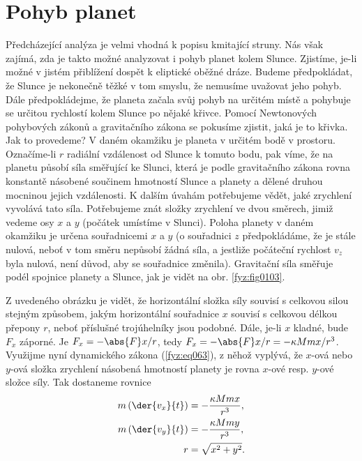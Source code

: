   \section{Pohyb planet}\label{fyz:IchapIXsecVII}
    Předcházející analýza je velmi vhodná k popisu kmitající stru\-ny. Nás však zajímá, zda je 
    takto 
    možné analyzovat i pohyb planet kolem Slunce. Zjistíme, je-li možné v jistém přiblížení dospět 
    k eliptické oběžné dráze. Budeme předpokládat, že Slunce je nekonečně těžké v tom smyslu, že 
    nemusíme uvažovat jeho pohyb. Dále předpokládejme, že planeta začala svůj pohyb na určitém 
    místě a pohybuje se určitou rychlostí kolem Slunce po nějaké křivce. Pomocí Newtonových 
    pohybových zákonů a gravitačního zákona se pokusíme zjistit, jaká je to křivka. Jak to 
    provedeme? V daném okamžiku je planeta v určitém bodě v prostoru. Označíme-li \(r\) radiální 
    vzdálenost od Slunce k tomuto bodu, pak víme, že na planetu působí síla směřující ke Slunci, 
    která je podle gravitačního zákona rovna konstantě násobené součinem hmotností Slunce a planety 
    a dělené druhou mocninou jejich vzdálenosti. K dalším úvahám potřebujeme vědět, jaké zrychlení 
    vyvolává tato síla. Potřebujeme znát složky zrychlení ve dvou směrech, jimiž vedeme osy \(x\) a 
    \(y\) (počátek umístíme v Slunci). Poloha planety v daném okamžiku je určena souřadnicemi \(x\) 
    a \(y\) (o souřadnici \(z\) předpokládáme, že je stále nulová, neboť v tom směru nepůsobí žádná 
    síla, a jestliže počáteční rychlost \(v_z\) byla nulová, není důvod, aby se souřadnice 
    změnila). Gravitační síla směřuje podél spojnice planety a Slunce, jak je vidět na obr. 
    \ref{fyz:fig0103}.


    Z uvedeného obrázku je vidět, že horizontální složka síly souvisí s celkovou silou stejným 
    způsobem, jakým horizontální souřadnice \(x\) souvisí s celkovou délkou přepony \(r\), neboť 
    příslušné trojúhelníky jsou podobné. Dále, je-li \(x\) kladné, bude \(F_x\) záporné. Je \(F_x = 
    -\abs{F}x/r\), tedy \(F_x = -\abs{F}x/r = -\kappa Mmx/r^3\). Využijme nyní dynamického zákona 
    (\ref{fyz:eq063}), z něhož vyplývá, že \(x\)-ová nebo \(y\)-ová složka zrychlení násobená 
    hmotností planety je rovna \(x\)-ové resp. \(y\)-ové složce síly. Tak dostaneme rovnice
    \begin{subequations}\label{fyz:eq133}
      \begin{align} 
        m\left(\der{v_x}{t}\right) &= -\frac{\kappa Mmx}{r^3}, \label{fyz:eq133a}   \\
        m\left(\der{v_y}{t}\right) &= -\frac{\kappa Mmy}{r^3}, \label{fyz:eq133b}   \\
                                r &= \sqrt{x^2+y^2}.          \label{fyz:eq133c} 
      \end{align}
    \end{subequations}
    
